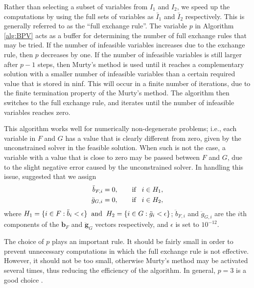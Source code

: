 \documentclass[11pt]{article}
\newcommand{\0}{\phantom{0}}
\begin{document}
Rather than selecting a subset of variables from $I_{1}$ and $I_{2}$, we speed up the computations by using the full sets of variables as $\bar{I}_{1}$ and $\bar{I}_{2}$ respectively. This is generally referred to as the ``full exchange rule''. The variable $p$ in Algorithm \ref{alg:BPV} acts as a buffer for determining the number of full exchange rules that may be tried. If the number of infeasible variables increases due to the exchange rule, then $p$ decreases by one. If the number of infeasible variables is still larger after $p - 1$ steps, then Murty's method is used until it reaches a complementary solution with a smaller number of infeasible variables than a certain required value that is stored in ninf. This will occur in a finite number of iterations, due to the finite termination property of the Murty's method. The algorithm then switches to the full exchange rule, and iterates until the number of infeasible variables reaches zero.

This algorithm works well for numerically non-degenerate problems; i.e., each variable in $F$ and $G$ has a value that is clearly different from zero, given by the unconstrained solver in the feasible solution. When such is not the case, a variable with a value that is close to zero may be passed between $F$ and $G$, due to the slight negative error caused by the unconstrained solver. In handling this issue, \citet{Cantar2004} suggested that we assign
\begin{align*}
\ddot{b}_{F, i} & = 0, \qquad \text{if} \hspace{3mm} i \in H_{1},\\
\ddot{g}_{G, i} & = 0, \qquad \text{if} \hspace{3mm} i \in H_{2},
\end{align*}
where $H_{1} = \{i \in F: \ddot{b}_{i} < \epsilon\} \hspace{2mm} \text{and} \hspace{2mm} H_{2} = \{i \in G: \ddot{g}_{i} < \epsilon\}$; $\ddot{b}_{F, i}$ and $\ddot{g}_{G, i}$ are the $i$th components of the $\ddot{\bm{b}}_{F}$ and $\ddot{\bm{g}}_{G}$ vectors respectively, and $\epsilon$ is set to $10^{-12}$. 

The choice of $p$ plays an important rule. It should be fairly small in order to prevent unnecessary computations in which the full exchange rule is not effective. However, it should not be too small, otherwise Murty's method may be activated several times, thus reducing the efficiency of the algorithm. In general, $p = 3$ is a good choice \citep{Judice1994}. 
\end{document}
